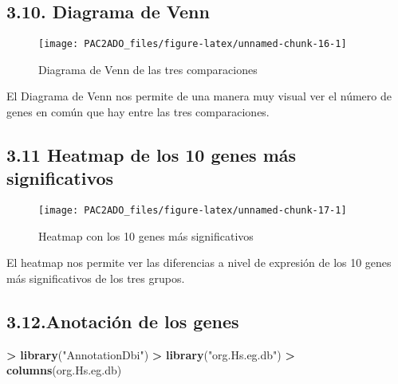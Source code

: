 \documentclass[
]{article}
\newenvironment{Shaded}{\begin{snugshade}}{\end{snugshade}}
\newcommand{\KeywordTok}[1]{\textcolor[rgb]{0.13,0.29,0.53}{\textbf{#1}}}
\newcommand{\NormalTok}[1]{#1}
\newcommand{\OperatorTok}[1]{\textcolor[rgb]{0.81,0.36,0.00}{\textbf{#1}}}
\newcommand{\StringTok}[1]{\textcolor[rgb]{0.31,0.60,0.02}{#1}}
\begin{document}
\hypertarget{diagrama-de-venn}{%
\subsection{3.10. Diagrama de Venn}\label{diagrama-de-venn}}

\begin{figure}

{\centering \texttt{[image: PAC2ADO\_files/figure-latex/unnamed-chunk-16-1]} 

}

\caption{Diagrama de Venn de las tres comparaciones}\label{fig:unnamed-chunk-16}
\end{figure}

El Diagrama de Venn nos permite de una manera muy visual ver el número
de genes en común que hay entre las tres comparaciones.

\hypertarget{heatmap-de-los-10-genes-muxe1s-significativos}{%
\subsection{3.11 Heatmap de los 10 genes más
significativos}\label{heatmap-de-los-10-genes-muxe1s-significativos}}

\begin{figure}

{\centering \texttt{[image: PAC2ADO\_files/figure-latex/unnamed-chunk-17-1]} 

}

\caption{Heatmap con los 10 genes más significativos}\label{fig:unnamed-chunk-17}
\end{figure}

El heatmap nos permite ver las diferencias a nivel de expresión de los
10 genes más significativos de los tres grupos.

\hypertarget{anotaciuxf3n-de-los-genes}{%
\subsection{3.12.Anotación de los
genes}\label{anotaciuxf3n-de-los-genes}}

\begin{Shaded}
\begin{Highlighting}[]
\OperatorTok{>}\StringTok{ }\KeywordTok{library}\NormalTok{(}\StringTok{"AnnotationDbi"}\NormalTok{)}
\OperatorTok{>}\StringTok{ }\KeywordTok{library}\NormalTok{(}\StringTok{"org.Hs.eg.db"}\NormalTok{)}
\OperatorTok{>}\StringTok{ }\KeywordTok{columns}\NormalTok{(org.Hs.eg.db)}
\end{Highlighting}
\end{Shaded}
\end{document}
